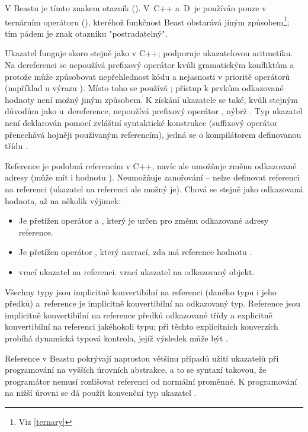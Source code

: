 V Beastu je tímto znakem otazník (). V~C++ a~D~je používán pouze v ternárním operátoru (), kteréhož funkčnost Beast obstarává jiným způsobem\footnote{Viz \ref{ternary}}; tím pádem je znak otazníku "postradatelný".

Ukazatel funguje skoro stejně jako v C++; podporuje ukazatelovou aritmetiku. Na dereferenci se nepoužívá prefixový operátor  kvůli gramatickým konfliktům a protože může způsobovat nepřehlednost kódu a nejasnosti v prioritě operátorů (například u výrazu ). Místo toho se používá ; přístup k prvkům odkazované hodnoty není možný jiným způsobem. K získání ukazatele se také, kvůli stejným důvodům jako u~dereference, nepoužívá prefixový operátor , nýbrž . Typ ukazatel není deklarován pomocí zvláštní syntaktické konstrukce (suffixový operátor  přenechává hojněji používaným referencím), jedná se o kompilátorem definovanou třídu .

Reference je podobná referencím v C++, navíc ale umožňuje změnu odkazované adresy (může mít i hodnotu ). Neumožňuje zanořování -- nelze definovat referenci na referenci (ukazatel na referenci ale možný je). Chová se stejně jako odkazovaná hodnota, až na několik výjimek:
\begin{itemize}
	\item Je přetížen operátor  a , který je určen pro změnu odkazované adresy reference.
	\item Je přetížen operátor , který navrací, zda má reference hodnotu .
	\item {} vrací ukazatel na referenci.  vrací ukazatel na odkazovaný objekt.
\end{itemize}

Všechny typy jsou implicitně konvertibilní na referenci (daného typu i jeho předků) a~reference je implicitně konvertibilní na odkazovaný typ. Reference jsou implicitně konvertibilní na reference předků odkazované třídy a explicitně konvertibilní na referenci jakéhokoli typu; při těchto explicitních konverzích probíhá dynamická typová kontrola, jejíž výsledek může být .

Reference v Beastu pokrývají naprostou většinu případů užití ukazatelů při programování na vyšších úrovních abstrakce, a to se syntaxí takovou, že programátor nemusí rozlišovat referenci od normální proměnné. K programování na nižší úrovni se dá použít konvenční typ ukazatel .

